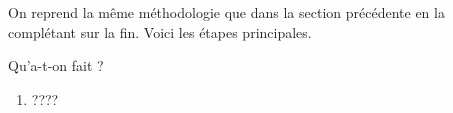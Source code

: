 \newpage
On reprend la même méthodologie que dans la section précédente en la complétant sur la fin. Voici les étapes principales.

\begin{multicols}{2}


\phantom{\emptybox\emptybox}%
	\deah

\emptybox\emptybox%
	\emptybox\emptybox\emptybox\emptybox\emptybox\emptybox\emptybox%
\emptybox\emptybox

\emptybox\emptybox%
\emptybox\emptybox

\phantom{\emptybox\emptybox}%
	\head


\medskip %

\phantom{\emptybox\emptybox\emptybox\emptybox\emptybox\emptybox\emptybox\emptybox\emptybox}%
	\deah

\emptybox\emptybox%
\emptybox\emptybox

\emptybox\emptybox%
\emptybox\emptybox

\phantom{\emptybox}%
	\head


\vfill\null
\columnbreak


\medskip %

\phantom{\emptybox}%
	\deah

\emptybox\emptybox%
\emptybox\emptybox

\emptybox\emptybox%
\emptybox\emptybox

\phantom{\emptybox\emptybox\emptybox\emptybox\emptybox\emptybox\emptybox\emptybox\emptybox}%
	\head

\vfill\null
\end{multicols}


\vspace{-1em}

Qu'a-t-on fait ?
\begin{enumerate}
	\item ????
\end{enumerate}


